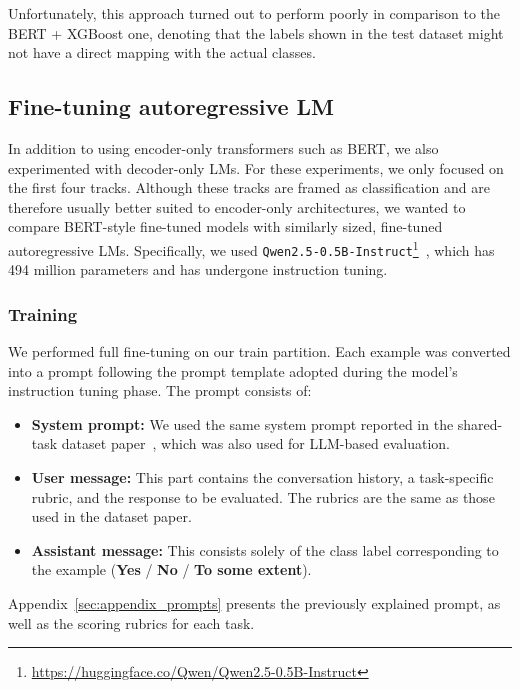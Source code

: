 \documentclass[11pt]{article}
\newcommand{\todo}[1]{\textcolor{blue}{\textbf{\small [TODO: #1]}}}
\begin{document}
Unfortunately, this approach turned out to perform poorly in comparison to the BERT + XGBoost one, denoting that the labels shown in the test dataset might not have a direct mapping with the actual classes.

\subsection{Fine-tuning autoregressive LM}
\label{sec:ftllm}

In addition to using encoder-only transformers such as BERT, we also experimented with decoder-only LMs.
For these experiments, we only focused on the first four tracks.
Although these tracks are framed as classification and are therefore usually better suited to encoder-only architectures, we wanted to compare BERT-style fine-tuned models with similarly sized, fine-tuned autoregressive LMs.
Specifically, we used \texttt{Qwen2.5-0.5B-Instruct}\footnote{\url{https://huggingface.co/Qwen/Qwen2.5-0.5B-Instruct}}~\cite{qwen2.5,qwen2}, which has 494 million parameters and has undergone instruction tuning.

\subsubsection{Training}

We performed full fine-tuning on our train partition.
Each example was converted into a prompt following the prompt template adopted during the model’s instruction tuning phase.
The prompt consists of:

\begin{itemize}
        \setlength\itemsep{0em}
	\item \textbf{System prompt:} We used the same system prompt reported in the shared-task dataset paper~\cite{maurya-etal-2025-unifying}, which was also used for LLM-based evaluation.
	\item \textbf{User message:} This part contains the conversation history, a task-specific rubric, and the response to be evaluated.
    The rubrics are the same as those used in the dataset paper.
	\item \textbf{Assistant message:} This consists solely of the class label corresponding to the example (\textbf{Yes} / \textbf{No} / \textbf{To some extent}).
\end{itemize}

Appendix~\ref{sec:appendix_prompts} presents the previously explained prompt, as well as the scoring rubrics for each task.
\end{document}
